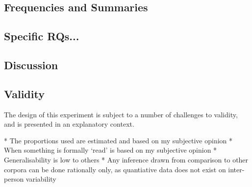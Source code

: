 




\subsection{Frequencies and Summaries}







\subsection{Specific RQs...}





\subsection{Discussion}

\subsection{}



\subsection{Validity}
The design of this experiment is subject to a number of challenges to validity, and is presented in an explanatory context.

* The proportions used are estimated and based on my subjective opinion
* When something is formally `read' is based on my subjective opinion
* Generalisability is low to others
* Any inference drawn from comparison to other corpora can be done rationally only, as quantiative data does not exist on inter-person variability




